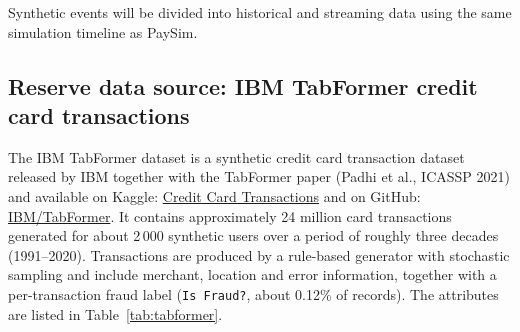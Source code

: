 \documentclass[titlepage]{article}
\begin{document}
Synthetic events will be divided into historical and streaming data using the same simulation timeline as PaySim.

\subsection{Reserve data source: IBM TabFormer credit card transactions}
\label{sec:tabformer}

The IBM TabFormer dataset is a synthetic credit card transaction dataset released by IBM together with the TabFormer
paper (Padhi et al., ICASSP 2021) and available on Kaggle: \href{https://www.kaggle.com/datasets/ealtman2019/credit-card-transactions}{Credit Card Transactions}
and on GitHub: \href{https://github.com/IBM/TabFormer}{IBM/TabFormer}. It contains approximately 24 million card transactions
generated for about 2\,000 synthetic users over a period of roughly three decades (1991--2020). Transactions are 
produced by a rule-based generator with stochastic sampling and include merchant, location and error information, 
together with a per-transaction fraud label (\texttt{Is Fraud?}, about 0.12\% of records). The attributes are
listed in Table~\ref{tab:tabformer}.
\end{document}
